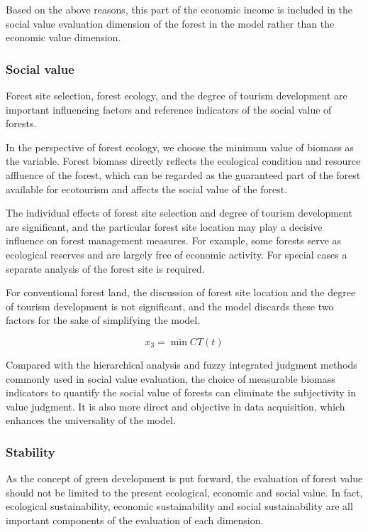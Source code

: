 Based on the above reasons, this part of the economic income is included in the social value evaluation dimension of the forest in the model rather than the economic value dimension.

\subsubsection{Social value}

Forest site selection, forest ecology, and the degree of tourism development are important influencing factors and reference indicators of the social value of forests.

In the perspective of forest ecology, we choose the minimum value of biomass as the variable. Forest biomass directly reflects the ecological condition and resource affluence of the forest, which can be regarded as the guaranteed part of the forest available for ecotourism and affects the social value of the forest.

The individual effects of forest site selection and degree of tourism development are significant, and the particular forest site location may play a decisive influence on forest management measures. For example, some forests serve as ecological reserves and are largely free of economic activity. For special cases a separate analysis of the forest site is required.

For conventional forest land, the discussion of forest site location and the degree of tourism development is not significant, and the model discards these two factors for the sake of simplifying the model.

$$
x_3=\min CT(t)
$$

Compared with the hierarchical analysis and fuzzy integrated judgment methods commonly used in social value evaluation, the choice of measurable biomass indicators to quantify the social value of forests can eliminate the subjectivity in value judgment. It is also more direct and objective in data acquisition, which enhances the universality of the model.

\subsubsection{Stability}

As the concept of green development is put forward, the evaluation of forest value should not be limited to the present ecological, economic and social value. In fact, ecological sustainability, economic sustainability and social sustainability are all important components of the evaluation of each dimension.

